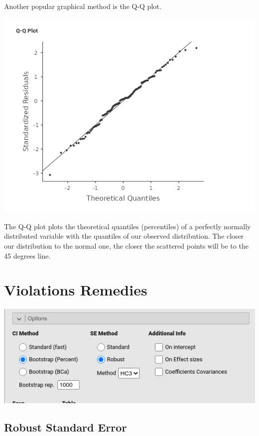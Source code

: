 \documentclass[
]{book}
\begin{document}
Another popular graphical method is the Q-Q plot.

\includegraphics{bookletpics/2_assumptions_output5.png}

The Q-Q plot plots the theoretical quantiles (percentiles) of a perfectly normally distributed variable with the quantiles of our observed distribution. The closer our distribution to the normal one, the closer the scattered points will be to the 45 degrees line.

\hypertarget{violations-remedies}{%
\section{Violations Remedies}\label{violations-remedies}}

\includegraphics{bookletpics/2_options_input1.png}

\hypertarget{robust-standard-error}{%
\subsection{Robust Standard Error}\label{robust-standard-error}}
\end{document}
